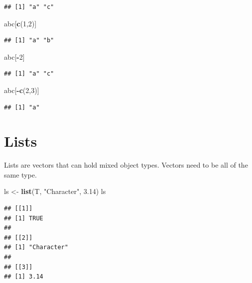 \documentclass[openany]{book}
\newenvironment{Shaded}{\begin{snugshade}}{\end{snugshade}}
\newcommand{\DecValTok}[1]{\textcolor[rgb]{0.00,0.00,0.81}{#1}}
\newcommand{\FloatTok}[1]{\textcolor[rgb]{0.00,0.00,0.81}{#1}}
\newcommand{\KeywordTok}[1]{\textcolor[rgb]{0.13,0.29,0.53}{\textbf{#1}}}
\newcommand{\NormalTok}[1]{#1}
\newcommand{\OperatorTok}[1]{\textcolor[rgb]{0.81,0.36,0.00}{\textbf{#1}}}
\newcommand{\StringTok}[1]{\textcolor[rgb]{0.31,0.60,0.02}{#1}}
\begin{document}
\begin{verbatim}
## [1] "a" "c"
\end{verbatim}

\begin{Shaded}
\begin{Highlighting}[]
\NormalTok{abc[}\KeywordTok{c}\NormalTok{(}\DecValTok{1}\NormalTok{,}\DecValTok{2}\NormalTok{)]}
\end{Highlighting}
\end{Shaded}

\begin{verbatim}
## [1] "a" "b"
\end{verbatim}

\begin{Shaded}
\begin{Highlighting}[]
\NormalTok{abc[}\OperatorTok{-}\DecValTok{2}\NormalTok{]}
\end{Highlighting}
\end{Shaded}

\begin{verbatim}
## [1] "a" "c"
\end{verbatim}

\begin{Shaded}
\begin{Highlighting}[]
\NormalTok{abc[}\OperatorTok{-}\KeywordTok{c}\NormalTok{(}\DecValTok{2}\NormalTok{,}\DecValTok{3}\NormalTok{)]}
\end{Highlighting}
\end{Shaded}

\begin{verbatim}
## [1] "a"
\end{verbatim}

\hypertarget{lists}{%
\section{Lists}\label{lists}}

Lists are vectors that can hold mixed object types. Vectors need to be all of the same type.

\begin{Shaded}
\begin{Highlighting}[]
\NormalTok{ls <-}\StringTok{ }\KeywordTok{list}\NormalTok{(T, }\StringTok{"Character"}\NormalTok{, }\FloatTok{3.14}\NormalTok{)}
\NormalTok{ls}
\end{Highlighting}
\end{Shaded}

\begin{verbatim}
## [[1]]
## [1] TRUE
## 
## [[2]]
## [1] "Character"
## 
## [[3]]
## [1] 3.14
\end{verbatim}
\end{document}
